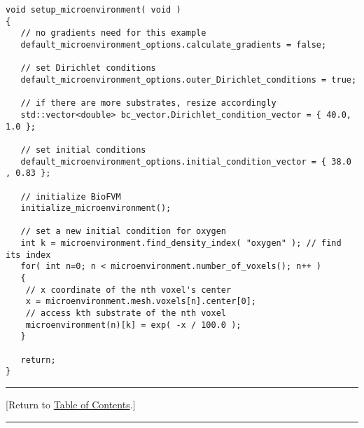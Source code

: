 \documentclass[12pt]{article}
\newcommand{\TOClink}{\begin{center}\hrule\vskip-5pt\phantom{.}\hfill[Return to \hyperlink{TOC}{Table of Contents}.]\hfill\phantom{.}\vskip3pt\hrule\end{center}}
\begin{document}
\begin{verbatim}
void setup_microenvironment( void )
{
   // no gradients need for this example 
   default_microenvironment_options.calculate_gradients = false; 
	
   // set Dirichlet conditions 
   default_microenvironment_options.outer_Dirichlet_conditions = true;
	
   // if there are more substrates, resize accordingly 
   std::vector<double> bc_vector.Dirichlet_condition_vector = { 40.0, 1.0 };
	 	
   // set initial conditions 
   default_microenvironment_options.initial_condition_vector = { 38.0 , 0.83 }; 
	
   // initialize BioFVM 
   initialize_microenvironment(); 	
   
   // set a new initial condition for oxygen
   int k = microenvironment.find_density_index( "oxygen" ); // find its index 
   for( int n=0; n < microenvironment.number_of_voxels(); n++ )
   {
    // x coordinate of the nth voxel's center  
    x = microenvironment.mesh.voxels[n].center[0]; 
    // access kth substrate of the nth voxel 
    microenvironment(n)[k] = exp( -x / 100.0 ); 
   }
	
   return; 
}
\end{verbatim}
\TOClink 
\end{document}
